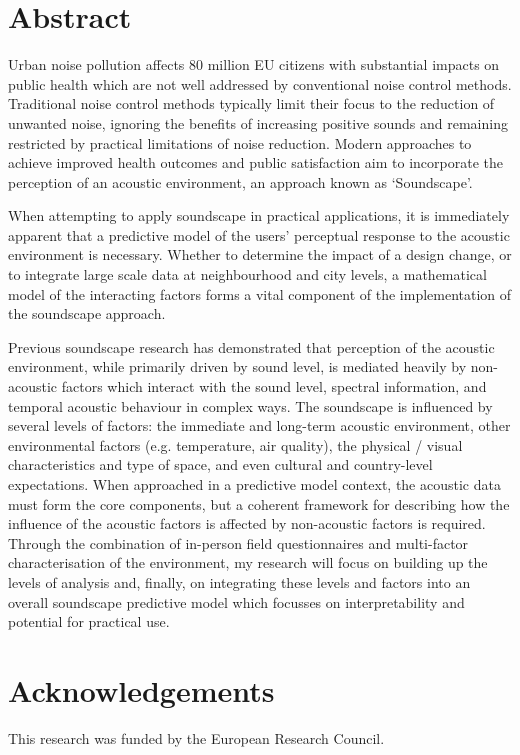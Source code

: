 \documentclass[oneside,fontsize=13pt,titlepage]{scrbook}
\begin{document}
\chapter*{Abstract}
Urban noise pollution affects 80 million EU citizens with substantial impacts on public health which are not well addressed by conventional noise control methods. Traditional noise control methods typically limit their focus to the reduction of unwanted noise, ignoring the benefits of increasing positive sounds and remaining restricted by practical limitations of noise reduction. Modern approaches to achieve improved health outcomes and public satisfaction aim to incorporate the perception of an acoustic environment, an approach known as ‘Soundscape’.

When attempting to apply soundscape in practical applications, it is immediately apparent that a predictive model of the users’ perceptual response to the acoustic environment is necessary. Whether to determine the impact of a design change, or to integrate large scale data at neighbourhood and city levels, a mathematical model of the interacting factors forms a vital component of the implementation of the soundscape approach.

Previous soundscape research has demonstrated that perception of the acoustic environment, while primarily driven by sound level, is mediated heavily by non-acoustic factors which interact with the sound level, spectral information, and temporal acoustic behaviour in complex ways. The soundscape is influenced by several levels of factors: the immediate and long-term acoustic environment, other environmental factors (e.g. temperature, air quality), the physical / visual characteristics and type of space, and even cultural and country-level expectations. When approached in a predictive model context, the acoustic data must form the core components, but a coherent framework for describing how the influence of the acoustic factors is affected by non-acoustic factors is required.  Through the combination of in-person field questionnaires and multi-factor characterisation of the environment, my research will focus on building up the levels of analysis and, finally, on integrating these levels and factors into an overall soundscape predictive model which focusses on interpretability and potential for practical use.


\chapter*{Acknowledgements}
This research was funded by the European Research Council.
\end{document}
